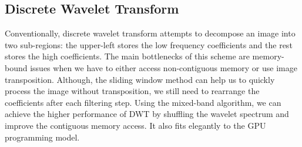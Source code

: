 \subsection{Discrete Wavelet Transform}
% 
Conventionally, discrete wavelet transform attempts to decompose an image into two sub-regions: the upper-left stores the low frequency coefficients and the rest stores the high coefficients.
The main bottlenecks of this scheme are memory-bound issues when we have to either access non-contiguous memory or use image transposition. 
Although, the sliding window method can help us to quickly process the image without transposition, we still need to rearrange the coefficients after each filtering step. 
Using the mixed-band algorithm, we can achieve the higher performance of DWT by shuffling the wavelet spectrum and improve the contiguous memory access. 
It also fits elegantly to the GPU programming model. 

